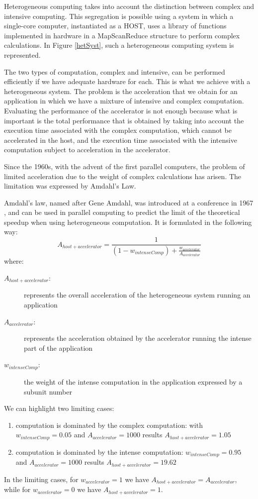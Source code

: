 Heterogeneous computing takes into account the distinction between complex and intensive computing. This segregation is possible using a system in which a single-core computer, instantiated as a HOST, uses a library of functions implemented in hardware in a MapScanReduce structure to perform complex calculations. In Figure \ref{hetSyst}, such a heterogeneous computing system is represented.


The two types of computation, complex and intensive, can be performed efficiently if we have adequate hardware for each. This is what we achieve with a heterogeneous system. The problem is the acceleration that we obtain for an application in which we have a mixture of intensive and complex computation. Evaluating the performance of the accelerator is not enough because what is important is the total performance that is obtained by taking into account the execution time associated with the complex computation, which cannot be accelerated in the host, and the execution time associated with the intensive computation subject to acceleration in the accelerator.

Since the 1960s, with the advent of the first parallel computers, the problem of limited acceleration due to the weight of complex calculations has arisen. The limitation was expressed by Amdahl's Law.

Amdahl's law, named after  Gene Amdahl,  was introduced  at a conference in 1967 \cite{amdahl1967}, and can be used in parallel computing to predict the limit of the theoretical speedup when using heterogeneous computation. It is formulated in the following way:
$$A_{host+accelerator} = \frac{1}{(1-w_{intenseComp}) + \frac{w_{accelerator}}{A_{accelerator}}}$$
where:
\begin{description}
    \item[$A_{host+accelerator}$:] represents the overall acceleration of the heterogeneous system running an application
    \item[$A_{accelerator}$:] represents the acceleration obtained by the accelerator running the intense part of the application
    \item[$w_{intenseComp}$:] the weight of the intense computation in the application expressed by a subunit number
\end{description}
We can highlight two limiting cases:
\begin{enumerate}
    \item computation is dominated by the complex computation: with $w_{intenseComp} = 0.05$ and $A_{accelerator} = 1000$ results $A_{host+accelerator} = 1.05$
    \item computation is dominated by the intense computation: $w_{intenseComp} = 0.95$ and $A_{accelerator} = 1000$ results $A_{host+accelerator} = 19.62$
\end{enumerate}
In the limiting cases, for $w_{accelerator} = 1$ we have $A_{host+accelerator} = A_{accelerator}$, while for $w_{accelerator} = 0$ we have $A_{host+accelerator} = 1$.

